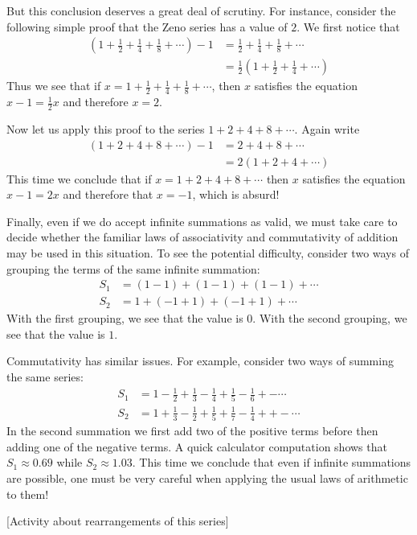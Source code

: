 \documentclass[11pt,oneside]{amsbook}
\theoremstyle{definition}
\theoremstyle{plain}
\theoremstyle{definition}
\theoremstyle{remark}
\numberwithin{equation}{section}
\numberwithin{figure}{section}
\begin{document}
But this conclusion deserves a great deal of scrutiny. For instance, consider the following simple proof that the Zeno series has a value of $2$. We first notice that
\begin{align*}
(1+\frac12+\frac14+\frac18+\cdots)-1&=\frac12+\frac14+\frac18+\cdots\\
                                    &=\frac12(1+\frac12+\frac14+\cdots)
\end{align*}
Thus we see that if $x=1+\frac12+\frac14+\frac18+\cdots$, then $x$ satisfies the equation $x-1=\frac12x$ and therefore $x=2$.

Now let us apply this proof to the series $1+2+4+8+\cdots$. Again write
\begin{align*}
(1+2+4+8+\cdots)-1&=2+4+8+\cdots\\
                  &=2(1+2+4+\cdots)
\end{align*}
This time we conclude that if $x=1+2+4+8+\cdots$ then $x$ satisfies the equation $x-1=2x$ and therefore that $x=-1$, which is absurd!

Finally, even if we do accept infinite summations as valid, we must take care to decide whether the familiar laws of associativity and commutativity of addition may be used in this situation. To see the potential difficulty, consider two ways of grouping the terms of the same infinite summation:
\begin{align*}
S_1&=(1-1)+(1-1)+(1-1)+\cdots\\
S_2&=1+(-1+1)+(-1+1)+\cdots
\end{align*}
With the first grouping, we see that the value is $0$. With the second grouping, we see that the value is $1$.

Commutativity has similar issues. For example, consider two ways of summing the same series:
\begin{align*}
S_1&=1-\frac12+\frac13-\frac14+\frac15-\frac16+-\cdots\\
S_2&=1+\frac13-\frac12+\frac15+\frac17-\frac14++-\cdots
\end{align*}
In the second summation we first add two of the positive terms before then adding one of the negative terms. A quick calculator computation shows that $S_1\approx0.69$ while $S_2\approx1.03$. This time we conclude that even if infinite summations are possible, one must be very careful when applying the usual laws of arithmetic to them!

[Activity about rearrangements of this series]

\newpage
\end{document}
